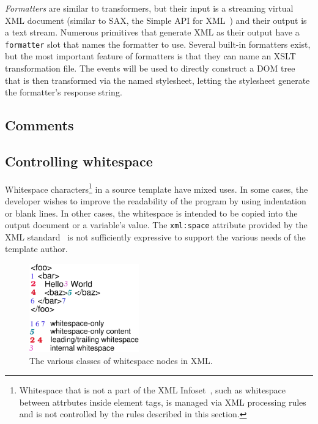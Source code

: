 \documentclass{www2003-submission}
\newcommand{\smtexttt}[1]{{\small\texttt{#1}}}
\begin{document}
\emph{Formatters} are similar to transformers, but their input is a streaming
virtual XML document (similar to SAX, the Simple API for XML~\cite{SAX})
and their output is a text stream.  Numerous primitives that generate
XML as their output have a \smtexttt{formatter} slot that names the
formatter to use. Several built-in formatters exist, but the most
important feature of formatters is that they can name an XSLT
transformation file.   The events will be used to directly construct a
DOM tree that is then transformed via the named stylesheet, letting the
stylesheet generate the formatter's response string.

\subsection{Comments}

\subsection{Controlling whitespace}

Whitespace characters\footnote{Whitespace that is not a part of the
XML Infoset~\cite{XML-infoset}, such as whitespace between attrbutes inside element
tags, is managed via XML processing rules and is not controlled by the
rules described in this section.} in a source template have mixed uses.  In some
cases, the developer wishes to improve the readability of the program
by using indentation or blank lines.  In other cases, the whitespace
is intended to be copied into the output document or a variable's
value.  The \smtexttt{xml:space} attribute provided by the XML
standard~\cite[2.10]{XML} is not sufficiently expressive to support
the various needs of the template author.

\begin{figure}[bt]
\begin{centering}
\includegraphics[height=1.5in]{etl-whitespace-rules.eps}
\caption{The various classes of whitespace nodes in XML. \label{fig-ws-rules}}
\end{centering}
\end{figure}
\end{document}
